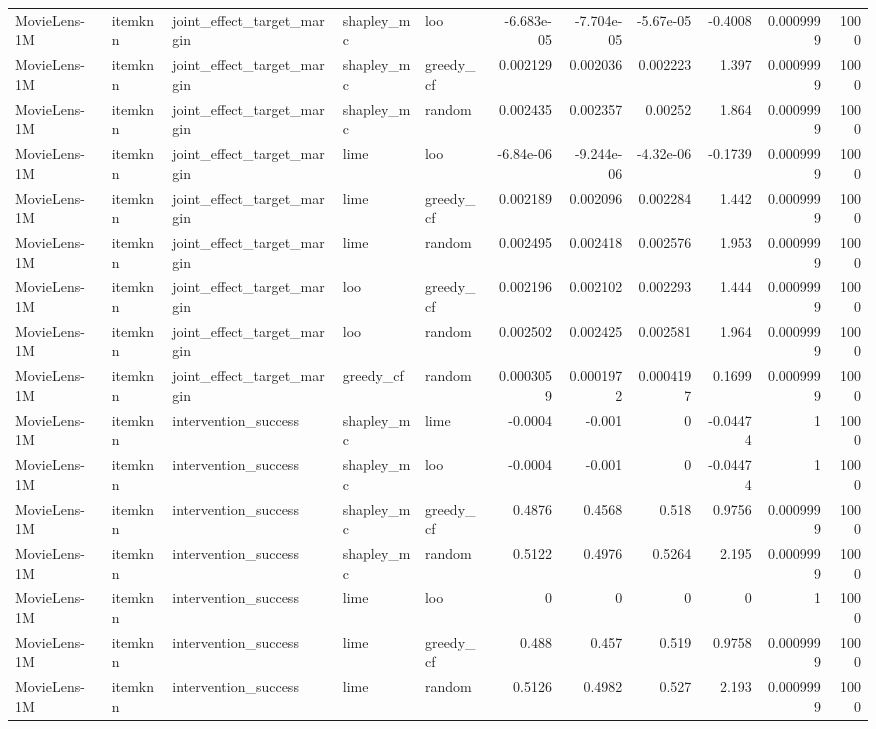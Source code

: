 \begin{table}[t]
\begin{tabular}{lllllrrrrrr}
MovieLens-1M & itemknn & joint\_effect\_target\_margin & shapley\_mc & loo & -6.683e-05 & -7.704e-05 & -5.67e-05 & -0.4008 & 0.0009999 & 1000 \\
MovieLens-1M & itemknn & joint\_effect\_target\_margin & shapley\_mc & greedy\_cf & 0.002129 & 0.002036 & 0.002223 & 1.397 & 0.0009999 & 1000 \\
MovieLens-1M & itemknn & joint\_effect\_target\_margin & shapley\_mc & random & 0.002435 & 0.002357 & 0.00252 & 1.864 & 0.0009999 & 1000 \\
MovieLens-1M & itemknn & joint\_effect\_target\_margin & lime & loo & -6.84e-06 & -9.244e-06 & -4.32e-06 & -0.1739 & 0.0009999 & 1000 \\
MovieLens-1M & itemknn & joint\_effect\_target\_margin & lime & greedy\_cf & 0.002189 & 0.002096 & 0.002284 & 1.442 & 0.0009999 & 1000 \\
MovieLens-1M & itemknn & joint\_effect\_target\_margin & lime & random & 0.002495 & 0.002418 & 0.002576 & 1.953 & 0.0009999 & 1000 \\
MovieLens-1M & itemknn & joint\_effect\_target\_margin & loo & greedy\_cf & 0.002196 & 0.002102 & 0.002293 & 1.444 & 0.0009999 & 1000 \\
MovieLens-1M & itemknn & joint\_effect\_target\_margin & loo & random & 0.002502 & 0.002425 & 0.002581 & 1.964 & 0.0009999 & 1000 \\
MovieLens-1M & itemknn & joint\_effect\_target\_margin & greedy\_cf & random & 0.0003059 & 0.0001972 & 0.0004197 & 0.1699 & 0.0009999 & 1000 \\
MovieLens-1M & itemknn & intervention\_success & shapley\_mc & lime & -0.0004 & -0.001 & 0 & -0.04474 & 1 & 1000 \\
MovieLens-1M & itemknn & intervention\_success & shapley\_mc & loo & -0.0004 & -0.001 & 0 & -0.04474 & 1 & 1000 \\
MovieLens-1M & itemknn & intervention\_success & shapley\_mc & greedy\_cf & 0.4876 & 0.4568 & 0.518 & 0.9756 & 0.0009999 & 1000 \\
MovieLens-1M & itemknn & intervention\_success & shapley\_mc & random & 0.5122 & 0.4976 & 0.5264 & 2.195 & 0.0009999 & 1000 \\
MovieLens-1M & itemknn & intervention\_success & lime & loo & 0 & 0 & 0 & 0 & 1 & 1000 \\
MovieLens-1M & itemknn & intervention\_success & lime & greedy\_cf & 0.488 & 0.457 & 0.519 & 0.9758 & 0.0009999 & 1000 \\
MovieLens-1M & itemknn & intervention\_success & lime & random & 0.5126 & 0.4982 & 0.527 & 2.193 & 0.0009999 & 1000 \\

\end{tabular}
\end{table}
